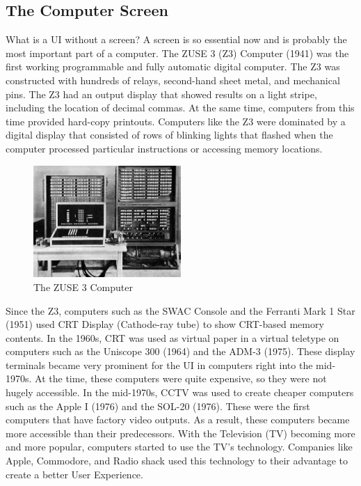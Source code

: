 \documentclass{article}
\begin{document}
\subsection{The Computer Screen}
What is a UI without a screen? A screen is so essential now and is probably the most important part of a computer. The ZUSE 3 (Z3) Computer (1941) was the first working programmable and fully automatic digital computer.  The Z3 was constructed with hundreds of relays, second-hand sheet metal, and mechanical pins. The Z3 had an output display that showed results on a light stripe, including the location of decimal commas. At the same time, computers from this time provided hard-copy printouts. Computers like the Z3 were dominated by a digital display that consisted of rows of blinking lights that flashed when the computer processed particular instructions or accessing memory locations. 
\cite{ref4} \cite{ref5}

\begin{figure}[H]
    \caption{The ZUSE 3 Computer}
    \label{image:ZUSE3}
    \centering
    \includegraphics[width=0.5\textwidth]{pics/z3.jpg}
\end{figure}

Since the Z3, computers such as the SWAC Console and the Ferranti Mark 1 Star (1951) used CRT Display (Cathode-ray tube) to show CRT-based memory contents. In the 1960s, CRT was used as virtual paper in a virtual teletype on computers such as the Uniscope 300 (1964) and the ADM-3 (1975). These display terminals became very prominent for the UI in computers right into the mid-1970s. At the time, these computers were quite expensive, so they were not hugely accessible. In the mid-1970s, CCTV was used to create cheaper computers such as the Apple I (1976) and the SOL-20 (1976). These were the first computers that have factory video outputs. As a result, these computers became more accessible than their predecessors. With the Television (TV) becoming more and more popular, computers started to use the TV's technology. Companies like Apple, Commodore, and Radio shack used this technology to their advantage to create a better User Experience.
\end{document}
